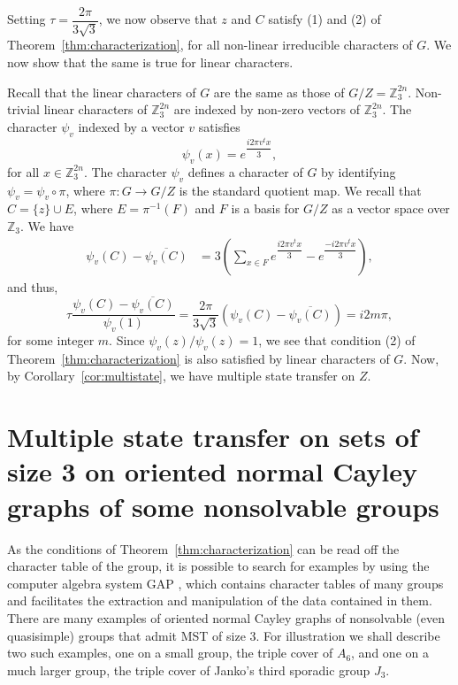 \documentclass{amsart}
\theoremstyle{plain}
\theoremstyle{remark}\newtheorem{con}[theorem]{Construction}
\theoremstyle{remark} \newtheorem*{remark}{Remark}
\theoremstyle{remark} \newtheorem{example}{Example}
\newcommand{\bb}{\mathbb}
\newcommand{\ov}{\overline}
\begin{document}
Setting $\tau=\dfrac{2 \pi}{3 \sqrt{3}}$, we now observe that $z$ and $C$ satisfy (1) and (2) of Theorem~\ref{thm:characterization}, for all non-linear irreducible characters of $G$. We now show that the same is true for linear characters.


Recall that the linear characters of $G$ are the same as those of $G/Z = \bb{Z}_{3}^{2n}$. Non-trivial linear characters of $\bb{Z}_{3}^{2n}$ are indexed by non-zero vectors of $\bb{Z}_{3}^{2n}$. The character $\psi_{v}$ indexed by a vector $v$ satisfies
\[\psi_{v}(x)= e^{\dfrac{i2\pi v^{t}x}{3}},\] for all $x\in \bb{Z}_{3}^{2n}$. The character $\psi_{v}$ 
defines a character of $G$ by identifying $\psi_{v}=\psi_{v} \circ \pi$, where $\pi: G \to G/Z$ is the standard quotient map. We recall that $C= \{z\}\cup E$, where $E=\pi^{-1}(F)$ and $F$ is a basis for $G/Z$ as a vector space over $\bb{Z}_{3}$.
 We have 
\begin{align*}
\psi_{v}(C)- \ov{\psi_{v}(C)} & = 3 \left( \sum\limits_{x \in F} e^{\dfrac{i2\pi v^{t}x}{3}} - e^{\dfrac{-i2\pi v^{t}x}{3}} \right),
\end{align*} 
and thus, \[\tau \dfrac{\psi_{v}(C)- \ov{\psi_{v}(C)}}{\psi_{v}(1)}= \dfrac{2\pi}{3 \sqrt{3}} \left( \psi_{v}(C)- \ov{\psi_{v}(C)} \right) =i2m \pi, \] for some integer $m$. Since $\psi_{v}(z)/\psi_{v}(z)=1$, we see that condition (2) of Theorem~\ref{thm:characterization} is also satisfied by linear characters of $G$. Now, by Corollary~\ref{cor:multistate}, we have multiple state transfer on $Z$.


\section{Multiple state transfer on sets of size 3 
on oriented normal Cayley graphs of some nonsolvable groups}\label{sec:nonsolvable}
As the conditions of Theorem~\ref{thm:characterization}
can be read off the character table of the group, it is
possible to search for examples by using the computer algebra system GAP \cite{GAP4}, which contains character tables of
many groups and facilitates the extraction and manipulation of the data contained in them. There are many examples of oriented normal Cayley graphs of nonsolvable (even quasisimple) groups that admit MST of size 3.
For illustration we shall describe two such examples, one on a small group, the triple cover of $A_6$, and one on a much larger group, the triple cover
of Janko's third sporadic group $J_3$.
\end{document}
